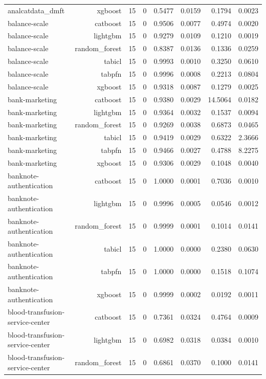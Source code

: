\begin{table}[htbp]
\begin{tabular}{lrrrrrrr}
analcatdata\_dmft & xgboost & 15 & 0 & 0.5477 & 0.0159 & 0.1794 & 0.0023 \\
balance-scale & catboost & 15 & 0 & 0.9506 & 0.0077 & 0.4974 & 0.0020 \\
balance-scale & lightgbm & 15 & 0 & 0.9279 & 0.0109 & 0.1210 & 0.0019 \\
balance-scale & random\_forest & 15 & 0 & 0.8387 & 0.0136 & 0.1336 & 0.0259 \\
balance-scale & tabicl & 15 & 0 & 0.9993 & 0.0010 & 0.3250 & 0.0610 \\
balance-scale & tabpfn & 15 & 0 & 0.9996 & 0.0008 & 0.2213 & 0.0804 \\
balance-scale & xgboost & 15 & 0 & 0.9318 & 0.0087 & 0.1279 & 0.0025 \\
bank-marketing & catboost & 15 & 0 & 0.9380 & 0.0029 & 14.5064 & 0.0182 \\
bank-marketing & lightgbm & 15 & 0 & 0.9364 & 0.0032 & 0.1537 & 0.0094 \\
bank-marketing & random\_forest & 15 & 0 & 0.9269 & 0.0038 & 0.6873 & 0.0465 \\
bank-marketing & tabicl & 15 & 0 & 0.9419 & 0.0029 & 0.6322 & 2.3666 \\
bank-marketing & tabpfn & 15 & 0 & 0.9466 & 0.0027 & 0.4788 & 8.2275 \\
bank-marketing & xgboost & 15 & 0 & 0.9306 & 0.0029 & 0.1048 & 0.0040 \\
banknote-authentication & catboost & 15 & 0 & 1.0000 & 0.0001 & 0.7036 & 0.0010 \\
banknote-authentication & lightgbm & 15 & 0 & 0.9996 & 0.0005 & 0.0546 & 0.0012 \\
banknote-authentication & random\_forest & 15 & 0 & 0.9999 & 0.0001 & 0.1014 & 0.0141 \\
banknote-authentication & tabicl & 15 & 0 & 1.0000 & 0.0000 & 0.2380 & 0.0630 \\
banknote-authentication & tabpfn & 15 & 0 & 1.0000 & 0.0000 & 0.1518 & 0.1074 \\
banknote-authentication & xgboost & 15 & 0 & 0.9999 & 0.0002 & 0.0192 & 0.0011 \\
blood-transfusion-service-center & catboost & 15 & 0 & 0.7361 & 0.0324 & 0.4764 & 0.0009 \\
blood-transfusion-service-center & lightgbm & 15 & 0 & 0.6982 & 0.0318 & 0.0384 & 0.0010 \\
blood-transfusion-service-center & random\_forest & 15 & 0 & 0.6861 & 0.0370 & 0.1000 & 0.0141 \\

\end{tabular}
\end{table}
